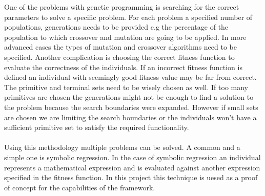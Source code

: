 One of the problems with genetic programming is searching for the correct parameters to solve a specific problem. For each problem
a specified number of populations, generations needs to be provided e.g the percentage of the population to which crossover and
mutation are going to be applied. In more advanced cases the types of mutation and crossover algorithms need
to be specified. Another complication is choosing the correct fitness function to evaluate the correctness of the individuals. If 
an incorrect fitness function is defined an individual with seemingly good fitness value may be far from correct. The primitive
and terminal sets need to be wisely chosen as well. If too many primitives are chosen the generations might not be enough to 
find a solution to the problem because the search boundaries were expanded. However if small sets are chosen we are 
limiting the search boundaries or the individuals won't have a sufficient primitive set to satisfy the required functionality.
\paragraph{}
Using this methodology multiple problems can be solved. A common and a simple one is symbolic regression. In the case
of symbolic regression an individual represents a mathematical expression and is evaluated against another expression
specified in the fitness function. In this project this technique is uesed as a proof
of concept for the capabilities of the framework.